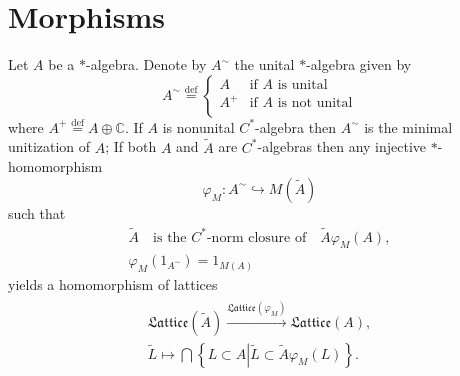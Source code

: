 \documentclass{beamer}
\theoremstyle{plain}
\newcommand{\be}{\begin{equation}}
\newcommand{\ee}{\end{equation}}
\newcommand{\bean}{\begin{eqnarray*}}
\newcommand{\eean}{\end{eqnarray*}}
\newcommand{\C}{\mathbb{C}}
\newcommand{\bydef}{\stackrel{\mathrm{def}}{=}}
\newcommand{\hookto}{\hookrightarrow}        %
\begin{document}
\section{Morphisms}
\begin{frame}
	Let $A$ be a $*$-algebra. Denote by $A^{\sim}$ the unital $*$-algebra given by
\be\label{unital_notation_eqn}
A^\sim\bydef\begin{cases}
	A & \text{if }A \text{ is unital}\\
	A^+ & \text{if }A \text{ is not unital}\\
\end{cases}
\ee
where $A^+\bydef A \oplus \C$.
If $A$ is nonunital $C^*$-algebra then 	$A^{\sim}$
is the minimal unitization of $A$;
If both $A$ and $\widetilde{A}$ are $C^*$-algebras then any injective  $*$-homomorphism 	
\be\label{phi_r_eqn}
\varphi_M: A^\sim  \hookto M\left(\widetilde A\right)	
\ee
such that
\be\label{closed_p_eqn}
\begin{split}
	\widetilde{ A }\quad \text{is the $C^*$-norm closure of} \quad \widetilde A \varphi_M\left( A\right),\\
	\varphi_M\left(1_{A^\sim} \right)  = 1_{M\left(A \right) }
\end{split}
\ee
yields a homomorphism of lattices
\bean
\begin{split}
	\mathfrak{Lattice}\left(\widetilde  A\right) \xrightarrow{\mathfrak{Lattice}\left(\varphi_M \right)}\mathfrak{Lattice} \left( A\right),\\
	\widetilde{L} \mapsto \bigcap \left\{L \subset A \left| \widetilde{L}\subset \widetilde{A}\varphi_M\left( L\right) \right.\right\}.
\end{split}
\eean
\end{frame}
\end{document}
